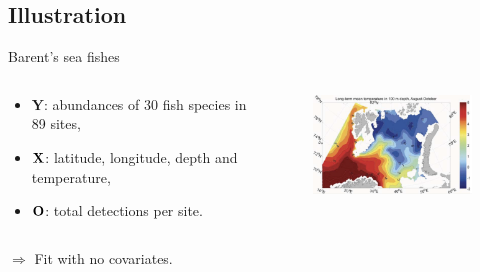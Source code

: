 \documentclass[11pt]{beamer}
\newcommand\Ob{{\bf O}}
\newcommand\Xb{{\bf X}}
\newcommand{\Ybf}{{\boldsymbol{Y}}}
\begin{document}
  \subsection{Illustration}
  \begin{frame}{Barent's sea fishes}
\begin{columns}
\begin{column}{0.5\linewidth}
\begin{itemize}
\item $\Ybf$: abundances of 30 fish species in 89 sites,\vspace{0.2cm}
\item $\Xb$: latitude, longitude, depth and temperature,
\item $\Ob$: total detections per site.
\end{itemize}
\end{column}
\begin{column}{0.5\linewidth}
\begin{figure}
  \includegraphics[width=6cm]{images/temp.png}
  \caption{\scriptsize{\citet{SEK09}}}\normalsize
  \end{figure}
\end{column}
\end{columns}
\begin{center}
  $\Rightarrow$ Fit with  no covariates.
  \end{center}
    \end{frame}
   
\end{document}

